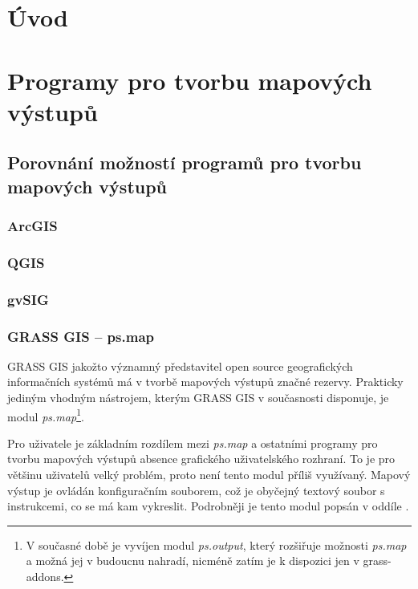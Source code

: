 \documentclass[a4paper,12pt,draft]{article}
\author{Anna Kratochvílová}
\newcommand{\modul}[1]{\emph{#1}}
\begin{document}
\renewcommand{\refname}{Použité zdroje}
\tableofcontents
\section{Úvod}

\section{Programy pro tvorbu mapových výstupů}

\subsection{Porovnání možností programů pro tvorbu mapových výstupů}

\subsubsection{ArcGIS}

\subsubsection{QGIS}

\subsubsection{gvSIG}

\subsubsection{GRASS GIS -- ps.map}
\label{sec:porovnani:psmap}
GRASS GIS jakožto významný představitel open source geografických informačních systémů má v tvorbě mapových výstupů značné rezervy. Prakticky jediným vhodným nástrojem, kterým GRASS GIS v současnosti disponuje, je modul \modul{ps.map}\footnote{V současné době je vyvíjen modul \modul{ps.output}, který rozšiřuje možnosti \modul{ps.map} a možná jej v budoucnu nahradí, nicméně zatím je k dispozici jen v grass-addons.}.

Pro uživatele je základním rozdílem mezi \modul{ps.map} a ostatními programy pro tvorbu mapových výstupů  absence grafického uživatelského rozhraní. To je pro většinu uživatelů velký problém, proto není tento modul příliš využívaný. Mapový výstup je ovládán konfiguračním souborem, což je obyčejný textový soubor s instrukcemi, co se má kam vykreslit. Podrobněji je tento modul popsán v oddíle .
\end{document}
